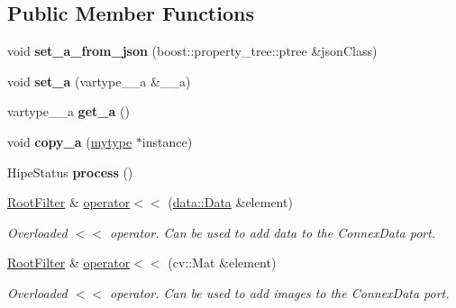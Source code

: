 \subsection*{Public Member Functions}
\begin{DoxyCompactItemize}
\item 
\mbox{\label{classfilter_1_1_algos_1_1_root_filter_aa14a8e31165787cf76247d99308b47e8}} 
void {\bfseries set\+\_\+a\+\_\+from\+\_\+json} (boost\+::property\+\_\+tree\+::ptree \&json\+Class)
\item 
\mbox{\label{classfilter_1_1_algos_1_1_root_filter_ac0980c593824774861f66e10ee24ca1c}} 
void {\bfseries set\+\_\+a} (vartype\+\_\+\+\_\+a \&\+\_\+\+\_\+a)
\item 
\mbox{\label{classfilter_1_1_algos_1_1_root_filter_ac77d92cc5c1f27fdef5c097b8033cb7d}} 
vartype\+\_\+\+\_\+a {\bfseries get\+\_\+a} ()
\item 
\mbox{\label{classfilter_1_1_algos_1_1_root_filter_ae277b643bb180ad1d3f606a56b005692}} 
void {\bfseries copy\+\_\+a} (\hyperlink{classfilter_1_1_algos_1_1_root_filter}{mytype} $\ast$instance)
\item 
\mbox{\label{classfilter_1_1_algos_1_1_root_filter_ac27cb210b7f5267e8312306c6171aa87}} 
Hipe\+Status {\bfseries process} ()
\item 
\hyperlink{classfilter_1_1_algos_1_1_root_filter}{Root\+Filter} \& \hyperlink{classfilter_1_1_algos_1_1_root_filter_a45d02535379a4b4b1cbb99180ba893e7}{operator$<$$<$} (\hyperlink{classfilter_1_1data_1_1_data}{data\+::\+Data} \&element)
\begin{DoxyCompactList}\small\item\em Overloaded $<$$<$ operator. Can be used to add data to the Connex\+Data port. \end{DoxyCompactList}\item 
\hyperlink{classfilter_1_1_algos_1_1_root_filter}{Root\+Filter} \& \hyperlink{classfilter_1_1_algos_1_1_root_filter_aaa4f38e30a03760153e0fc3f7d7f409e}{operator$<$$<$} (cv\+::\+Mat \&element)
\begin{DoxyCompactList}\small\item\em Overloaded $<$$<$ operator. Can be used to add images to the Connex\+Data port. \end{DoxyCompactList}\end{DoxyCompactItemize}
